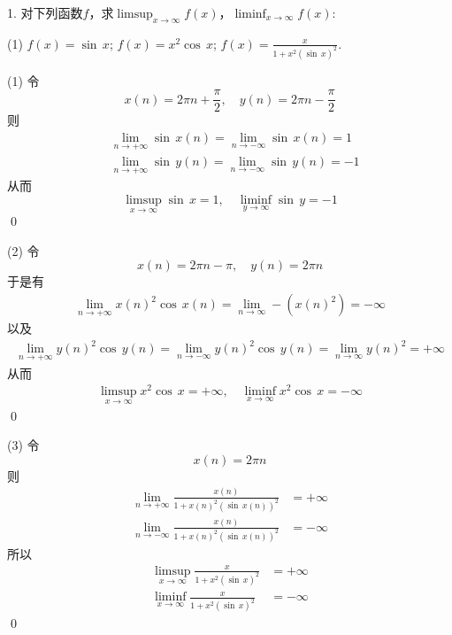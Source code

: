 \exercise

1. 对下列函数$f$，求$\displaystyle\limsup_{x \to \infty} f(x)$，$\displaystyle\liminf_{x \to \infty} f(x)$:

\begin{tasks}(1)
    \task $f(x) = \sin \, x$; 
    \task $f(x) = x^2 \cos \, x$;
    \task $f(x) = \displaystyle\frac{x}{1+x^2 \left(\sin \, x\right)^2}$.
\end{tasks}

(1) \solve 令
\begin{equation}
    x(n) = 2\pi n + \frac{\pi}{2}, \quad y(n) = 2 \pi n - \frac{\pi}{2}
\end{equation}
则
\begin{align}
    &\lim_{n \to +\infty} \sin \, x(n) = \lim_{n \to -\infty} \sin \, x(n) = 1 \\
    &\lim_{n \to +\infty} \sin \, y(n) = \lim_{n \to -\infty} \sin \, y(n) = -1
\end{align}
从而
\begin{equation}
    \limsup_{x \to \infty} \sin \, x = 1, \quad \liminf_{y \to \infty} \sin \, y = -1
\end{equation}
\qed\bigskip

(2) \solve 令
\begin{equation}
    x(n) = 2\pi n - \pi, \quad y(n) = 2\pi n
\end{equation}
于是有
\begin{align}
    \lim_{n \to +\infty} x(n)^2 \cos \, x(n) = \lim_{n \to \infty} -(x(n)^2) = -\infty
\end{align}
以及
\begin{align}
    \lim_{n \to +\infty} y(n)^2 \cos \, y(n) = \lim_{n \to -\infty} y(n)^2 \cos \, y(n) = \lim_{n \to \infty} y(n)^2 = +\infty
\end{align}
从而
\begin{align}
    \limsup_{x \to \infty} x^2 \cos \, x = +\infty, \quad \liminf_{x \to \infty} x^2 \cos \, x = - \infty
\end{align}
\qed\bigskip

(3) \solve 令
\begin{equation}
    x(n) = 2\pi n
\end{equation}
则
\begin{align}
    \lim_{n \to +\infty} \frac{x(n)}{1+x(n)^2 \left(\sin \, x(n)\right)^2} &= +\infty \\
    \lim_{n \to -\infty} \frac{x(n)}{1+x(n)^2 \left(\sin \, x(n)\right)^2} &= -\infty 
\end{align}
所以
\begin{align}
    \limsup_{x \to \infty} \frac{x}{1+x^2 \left(\sin \, x\right)^2} &= +\infty \\
    \liminf_{x \to \infty} \frac{x}{1+x^2 \left(\sin \, x\right)^2} &= -\infty 
\end{align}
\qed\bigskip

